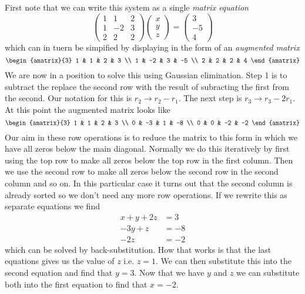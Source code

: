 First note that we can write this system as a single \emph{matrix equation}
\[
    \begin{pmatrix}
        1 & 1 & 2 \\
        1 & -2 & 3 \\
        2 & 2 & 2
    \end{pmatrix}
    \begin{pmatrix}
        x \\ y \\ z
    \end{pmatrix}
       =
    \begin{pmatrix}
        3 \\ -5 \\ 4
    \end{pmatrix}
\]
which can in tuern be simpified by displaying in the form of an
\emph{augmented matrix}
\[
    \begin{amatrix}{3}
        1 & 1 & 2 & 3 \\
        1 & -2 & 3 & -5 \\
        2 & 2 & 2 & 4
    \end{amatrix}
\]
We are now in a position to solve this using Gaussian elimination. Step 1 is
to subtract the replace the second row with the result of subracting the first
from the second. Our notation for this is $r_2 \to r_2 - r_1$. The next step
is $r_3 \to r_3 - 2r_1$. At this point the augmented matrix looks like
\[
    \begin{amatrix}{3}
        1 & 1 & 2 & 3 \\
        0 & -3 & 1 & -8 \\
        0 & 0 & -2 & -2
    \end{amatrix}
\]
Our aim in these row operations is to reduce the matrix to this form in which
we have all zeros below the main diagonal. Normally we do this iteratively by
first using the top row to make all zeros below the top row in the first
column. Then we use the second row to make all zeros below the second row in
the second column and so on. In this particular case it turns out that the
second column is already sorted so we don't need any more row operations.
If we rewrite this as separate equations we find
\begin{align*}
    x +y + 2z &= 3\\
     -3y + z  &= -8\\
          -2z &= -2
    \label{system1}
\end{align*}
which can be solved by back-substitution. How that works is that the last
equations gives us the value of $z$ i.e. $z=1$. We can then substitute this
into the second equation and find that $y=3$. Now that we have $y$ and $z$ we
can substitute both into the first equation to find that $x=-2$.

